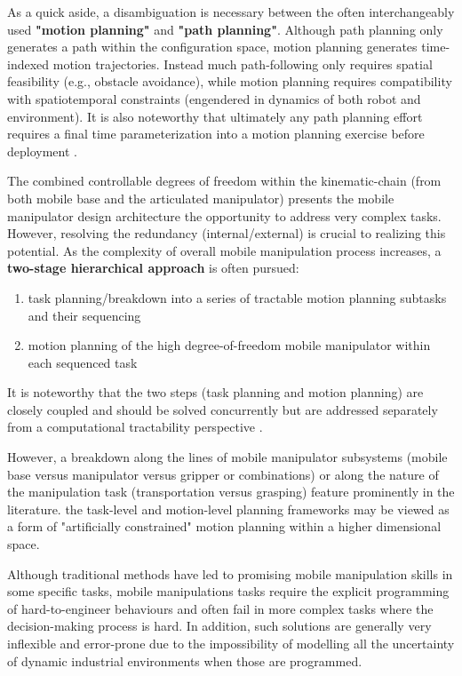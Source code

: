 As a quick aside, a disambiguation is necessary between the often interchangeably used
\textbf{"motion planning"} and \textbf{"path planning"}.
Although path planning only generates a path within the configuration space,
motion planning generates time-indexed motion trajectories. Instead much path-following only requires
spatial feasibility (e.g., obstacle avoidance), while motion planning
requires compatibility with spatiotemporal constraints (engendered in dynamics of both robot and
environment). It is also noteworthy that ultimately any path planning effort requires a final time
parameterization into a motion planning exercise before deployment \cite{thakar2023survey}.

The combined controllable degrees of freedom within the kinematic-chain (from both
mobile base and the articulated manipulator) presents the mobile
manipulator design architecture the opportunity to address very
complex tasks. However, resolving the redundancy (internal/external) is crucial to realizing
this potential. As the complexity of overall mobile manipulation process
increases, a \textbf{two-stage hierarchical approach} is often pursued:
\begin{enumerate}
	\item task planning/breakdown into a series of tractable motion planning
	      subtasks and their sequencing
	\item motion planning of the high
	      degree-of-freedom mobile manipulator within each sequenced task
\end{enumerate}
It is noteworthy that the two steps (task planning and motion planning) are closely coupled
and should be solved concurrently but are addressed separately from a computational tractability
perspective \cite{thakar2023survey}.

However, a breakdown along the lines of mobile manipulator subsystems
(mobile base versus manipulator versus gripper or combinations)
or along the nature of the manipulation task (transportation versus grasping) feature prominently
in the literature. the task-level and motion-level planning frameworks
may be viewed as a form of "artificially constrained" motion planning within a higher dimensional space.

Although traditional methods have led to promising mobile manipulation skills in some specific tasks,
mobile manipulations tasks require the explicit programming of hard-to-engineer behaviours and often fail
in more complex tasks where the decision-making process is hard. In addition, such solutions
are generally very inflexible and error-prone due to the impossibility
of modelling all the uncertainty of dynamic industrial environments when those are programmed.

